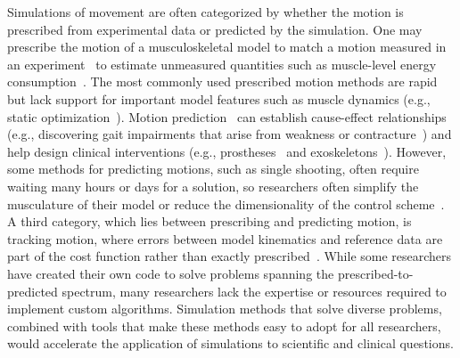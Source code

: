 \documentclass[10pt,letterpaper]{article}
\begin{document}
Simulations of movement are often categorized by whether the motion is prescribed from experimental data or predicted by the simulation. One may prescribe the motion of a musculoskeletal model to match a motion measured in an experiment~\cite{Thelen:2003bba,Lloyd:2003} to estimate unmeasured quantities such as muscle-level energy consumption~\cite{Farris:2014du,Jackson:2017go}. The most commonly used prescribed motion methods are rapid but lack support for important model features such as muscle dynamics (e.g., static optimization~\cite{Prilutsky:2002}).
Motion prediction~\cite{Geijtenbeek:2019} can establish cause-effect relationships (e.g., discovering gait impairments that arise from weakness or contracture~\cite{Ong:2019}) and help design clinical interventions (e.g., prostheses~\cite{Handford:2016kd} and exoskeletons~\cite{Millard:2017}).
However, some methods for predicting motions, such as single shooting,  often require waiting many hours or days for a solution, so researchers often simplify the musculature of their model or reduce the dimensionality of the control scheme~\cite{Anderson:2001gv,Ong:2019}.
A third category, which lies between prescribing and predicting motion, is tracking motion, where errors between model kinematics and reference data are part of the cost function rather than exactly prescribed~\cite{Lin:2017jp}.
While some researchers have created their own code to solve problems spanning the prescribed-to-predicted spectrum, many researchers lack the expertise or resources required to implement custom algorithms.
Simulation methods that solve diverse problems, combined with tools that make these methods easy to adopt for all researchers, would accelerate the application of simulations to scientific and clinical questions.
\end{document}
